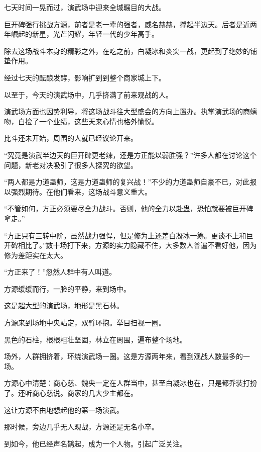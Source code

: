 
\begin{this_body}

七天时间一晃而过，演武场中迎来全城瞩目的大战。

巨开碑强行挑战方源，前者是老一辈的强者，威名赫赫，撑起半边天。后者是近两年崛起的新星，光芒闪耀，年轻一代的少年高手。

除去这场战斗本身的精彩之外，在吃之前，白凝冰和炎突一战，更起到了绝妙的铺垫作用。

经过七天的酝酿发酵，影响扩到到整个商家城上下。

以至于，今天的演武场中，几乎挤满了前来观战的人。

演武场方面也因势利导，将这场战斗往大型盛会的方向上置办。执掌演武场的商螭吻，白捡了一个业绩，这些天来心情也格外愉悦。

比斗还未开始，周围的人就已经议论开来。

“究竟是演武半边天的巨开碑更老辣，还是方正能以弱胜强？”许多人都在讨论这个问题，新老对决吸引了很多人探究的欲望。

“两人都是力道蛊师，这是力道蛊师的复兴战！”不少的力道蛊师自豪不已，对此报以强烈期待。在他们看来，这场战斗意义重大。

“不管如何，方正必须要尽全力战斗。否则，他的全力以赴蛊，恐怕就要被巨开碑拿走。”

“方正只有三转中阶，虽然战力强悍，但是修为上还差白凝冰一筹。更谈不上和巨开碑相比了。”数十场打下来，方源的实力隐藏不住，大多数人普遍不看好他，因为修为差距实在太大。

“方正来了！”忽然人群中有人叫道。

方源缓缓而行，一脸的平静，来到场中。

这是超大型的演武场，地形是黑石林。

方源来到场地中央站定，双臂环抱。举目扫视一圈。

黑色的石柱，根根粗壮坚固，林立在周围，遍布整个场地。

场外，人群拥挤着，环绕演武场一圈。这是方源两年来，看到观战人数最多的一场。

方源心中清楚：商心慈、魏央一定在人群当中，甚至白凝冰也在，只是都乔装打扮了。还听商心慈说。商家的几大少主都在。

这让方源不由地想起他的第一场演武。

那时候，旁边几乎无人观战，方源还是无名小卒。

到如今，他已经声名鹊起，成为一个人物。引起广泛关注。


\end{this_body}
